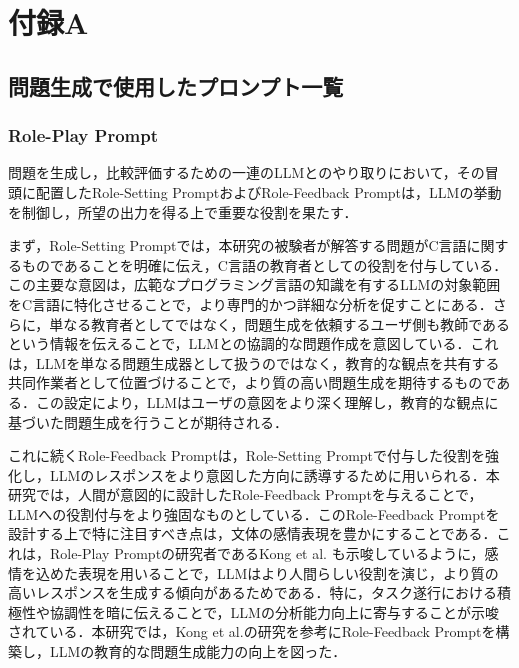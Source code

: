 \documentclass[11pt]{jreport}
\begin{document}
\chapter*{付録A}  %
\begin{appendices}
\renewcommand{\thesection}{\Alph{section}}
\renewcommand{\thesubsection}{\thesection.\arabic{subsection}}
\renewcommand{\thefigure}{\thesection.\arabic{figure}}

\section{問題生成で使用したプロンプト一覧}
\subsection{Role-Play Prompt}
問題を生成し，比較評価するための一連のLLMとのやり取りにおいて，その冒頭に配置したRole-Setting PromptおよびRole-Feedback Promptは，LLMの挙動を制御し，所望の出力を得る上で重要な役割を果たす．

まず，Role-Setting Promptでは，本研究の被験者が解答する問題がC言語に関するものであることを明確に伝え，C言語の教育者としての役割を付与している．この主要な意図は，広範なプログラミング言語の知識を有するLLMの対象範囲をC言語に特化させることで，より専門的かつ詳細な分析を促すことにある．さらに，単なる教育者としてではなく，問題生成を依頼するユーザ側も教師であるという情報を伝えることで，LLMとの協調的な問題作成を意図している．これは，LLMを単なる問題生成器として扱うのではなく，教育的な観点を共有する共同作業者として位置づけることで，より質の高い問題生成を期待するものである．この設定により，LLMはユーザの意図をより深く理解し，教育的な観点に基づいた問題生成を行うことが期待される．

これに続くRole-Feedback Promptは，Role-Setting Promptで付与した役割を強化し，LLMのレスポンスをより意図した方向に誘導するために用いられる．本研究では，人間が意図的に設計したRole-Feedback Promptを与えることで，LLMへの役割付与をより強固なものとしている．このRole-Feedback Promptを設計する上で特に注目すべき点は，文体の感情表現を豊かにすることである．これは，Role-Play Promptの研究者であるKong et al. \cite{Role_play}も示唆しているように，感情を込めた表現を用いることで，LLMはより人間らしい役割を演じ，より質の高いレスポンスを生成する傾向があるためである．特に，タスク遂行における積極性や協調性を暗に伝えることで，LLMの分析能力向上に寄与することが示唆されている．本研究では，Kong et al.の研究を参考にRole-Feedback Promptを構築し，LLMの教育的な問題生成能力の向上を図った．



\end{appendices}
\end{document}
